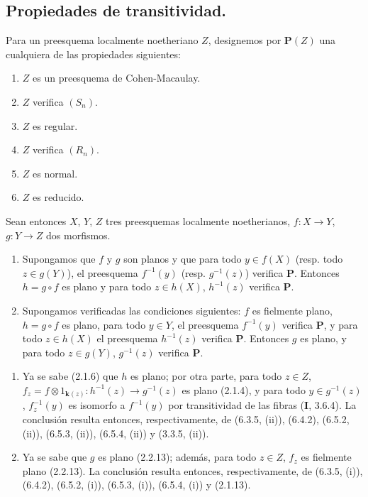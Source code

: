 
\subsection{Propiedades de transitividad.}

\begin{proposition}[6.6.1]
\label{IV.2.s6.6.1-fr}
Para un preesquema localmente noetheriano $Z$, designemos por $\boldsymbol{P}(Z)$ una
cualquiera de las propiedades siguientes:
\begin{enumerate}
\item[\textup{a)}] $Z$ es un preesquema de Cohen-Macaulay.
\item[\textup{b)}] $Z$ verifica $(S_n)$.
\item[\textup{c)}] $Z$ es regular.
\item[\textup{d)}] $Z$ verifica $(R_n)$.
\item[\textup{e)}] $Z$ es normal.
\item[\textup{f)}] $Z$ es reducido.
\end{enumerate}
Sean entonces $X$, $Y$, $Z$ tres preesquemas localmente noetherianos,
$f:X\to Y$, $g:Y\to Z$ dos morfismos.
\begin{enumerate}
\item[\textup{(i)}] Supongamos que $f$ y $g$ son planos y que para todo
$y\in f(X)$ \textup{(resp.} todo $z\in g(Y)$), el preesquema $f^{-1}(y)$
\textup{(resp.} $g^{-1}(z)$) verifica $\boldsymbol{P}$. Entonces $h=g\circ f$ es plano y para todo
$z\in h(X)$, $h^{-1}(z)$ verifica $\boldsymbol{P}$.
\item[\textup{(ii)}] Supongamos verificadas las condiciones siguientes: $f$ es
fielmente plano, $h=g\circ f$ es plano, para todo $y\in Y$, el
preesquema $f^{-1}(y)$ verifica $\boldsymbol{P}$, y para todo $z\in h(X)$ el
preesquema $h^{-1}(z)$ verifica $\boldsymbol{P}$. Entonces $g$ es plano, y para todo
$z\in g(Y)$, $g^{-1}(z)$ verifica $\boldsymbol{P}$.
\end{enumerate}
\end{proposition}

\begin{enumerate}
\item[(i)] Ya se sabe (2.1.6) que $h$ es plano; por otra parte, para todo
      $z\in Z$,
$f_z=f\otimes 1_{\mathbf{k}(z)}:h^{-1}(z)\longrightarrow g^{-1}(z)$ es plano (2.1.4), y para todo $y\in g^{-1}(z)$, $f_z^{-1}(y)$ es
isomorfo a $f^{-1}(y)$ por transitividad de las fibras (\textbf I, 3.6.4). La
conclusión resulta entonces, respectivamente, de (6.3.5, (ii)), (6.4.2),
(6.5.2, (ii)), (6.5.3, (ii)), (6.5.4, (ii)) y (3.3.5, (ii)).
\item[(ii)] Ya se sabe que $g$ es plano (2.2.13); además, para todo
      $z\in Z$, $f_z$ es fielmente plano (2.2.13). La conclusión
      resulta entonces, respectivamente, de (6.3.5, (i)), (6.4.2),
(6.5.2, (i)), (6.5.3, (i)), (6.5.4, (i)) y (2.1.13).
\end{enumerate}

